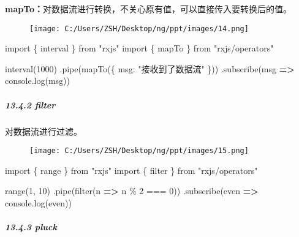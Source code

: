 \documentclass[
]{article}
\newenvironment{Shaded}{}{}
\newcommand{\BuiltInTok}[1]{#1}
\newcommand{\DataTypeTok}[1]{\textcolor[rgb]{0.56,0.13,0.00}{#1}}
\newcommand{\DecValTok}[1]{\textcolor[rgb]{0.25,0.63,0.44}{#1}}
\newcommand{\FunctionTok}[1]{\textcolor[rgb]{0.02,0.16,0.49}{#1}}
\newcommand{\ImportTok}[1]{#1}
\newcommand{\KeywordTok}[1]{\textcolor[rgb]{0.00,0.44,0.13}{\textbf{#1}}}
\newcommand{\NormalTok}[1]{#1}
\newcommand{\OperatorTok}[1]{\textcolor[rgb]{0.40,0.40,0.40}{#1}}
\newcommand{\StringTok}[1]{\textcolor[rgb]{0.25,0.44,0.63}{#1}}
\begin{document}
\textbf{mapTo：}对数据流进行转换，不关心原有值，可以直接传入要转换后的值。

\begin{figure}
\centering
\texttt{[image: C:/Users/ZSH/Desktop/ng/ppt/images/14.png]}
\caption{}
\end{figure}

\begin{Shaded}
\begin{Highlighting}[]
\ImportTok{import}\NormalTok{ \{ interval \} }\ImportTok{from} \StringTok{"rxjs"}
\ImportTok{import}\NormalTok{ \{ mapTo \} }\ImportTok{from} \StringTok{"rxjs/operators"}

\FunctionTok{interval}\NormalTok{(}\DecValTok{1000}\NormalTok{)}
  \OperatorTok{.}\FunctionTok{pipe}\NormalTok{(}\FunctionTok{mapTo}\NormalTok{(\{ }\DataTypeTok{msg}\OperatorTok{:} \StringTok{"接收到了数据流"}\NormalTok{ \}))}
  \OperatorTok{.}\FunctionTok{subscribe}\NormalTok{(msg }\KeywordTok{=\textgreater{}} \BuiltInTok{console}\OperatorTok{.}\FunctionTok{log}\NormalTok{(msg))}
\end{Highlighting}
\end{Shaded}

\hypertarget{1342-filter}{%
\subparagraph{13.4.2 filter}\label{1342-filter}}

对数据流进行过滤。

\begin{figure}
\centering
\texttt{[image: C:/Users/ZSH/Desktop/ng/ppt/images/15.png]}
\caption{}
\end{figure}

\begin{Shaded}
\begin{Highlighting}[]
\ImportTok{import}\NormalTok{ \{ range \} }\ImportTok{from} \StringTok{"rxjs"}
\ImportTok{import}\NormalTok{ \{ filter \} }\ImportTok{from} \StringTok{"rxjs/operators"}

\FunctionTok{range}\NormalTok{(}\DecValTok{1}\OperatorTok{,} \DecValTok{10}\NormalTok{)}
  \OperatorTok{.}\FunctionTok{pipe}\NormalTok{(}\FunctionTok{filter}\NormalTok{(n }\KeywordTok{=\textgreater{}}\NormalTok{ n }\OperatorTok{\%} \DecValTok{2} \OperatorTok{===} \DecValTok{0}\NormalTok{))}
  \OperatorTok{.}\FunctionTok{subscribe}\NormalTok{(even }\KeywordTok{=\textgreater{}} \BuiltInTok{console}\OperatorTok{.}\FunctionTok{log}\NormalTok{(even))}
\end{Highlighting}
\end{Shaded}

\hypertarget{1343-pluck}{%
\subparagraph{13.4.3 pluck}\label{1343-pluck}}
\end{document}
